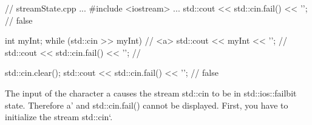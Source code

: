 
\begin{cpp}
// streamState.cpp
...
#include <iostream>
...
std::cout << std::cin.fail() << '\n'; // false

int myInt;
while (std::cin >> myInt){ // <a>
	std::cout << myInt << '\n'; //
	std::cout << std::cin.fail() << '\n'; //
}

std::cin.clear();
std::cout << std::cin.fail() << '\n'; // false
\end{cpp}

The input of the character a causes the stream std::cin to be in std::ios::failbit state. Therefore a' and std::cin.fail() cannot be displayed. First, you have to initialize the stream std::cin‘.































